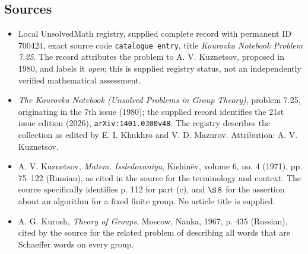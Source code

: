 \documentclass[11pt]{article}
\begin{document}
\subsection{Sources}
\begin{itemize}
\item Local UnsolvedMath registry, supplied complete record with permanent ID \(700424\), exact source code \texttt{catalogue entry}, title \emph{Kourovka Notebook Problem 7.25}. The record attributes the problem to A. V. Kuznetsov, proposed in 1980, and labels it \emph{open}; this is supplied registry status, not an independently verified mathematical assessment.
\item \emph{The Kourovka Notebook (Unsolved Problems in Group Theory)}, problem 7.25, originating in the 7th issue (1980); the supplied record identifies the 21st issue edition (2026), \texttt{arXiv:1401.0300v48}. The registry describes the collection as edited by E. I. Khukhro and V. D. Mazurov. Attribution: A. V. Kuznetsov.
\item A. V. Kuznetsov, \emph{Matem. Issledovaniya}, Kishin\"ev, volume 6, no. 4 (1971), pp. 75--122 (Russian), as cited in the source for the terminology and context. The source specifically identifies p. 112 for part (c), and \(\S\,8\) for the assertion about an algorithm for a fixed finite group. No article title is supplied.
\item A. G. Kurosh, \emph{Theory of Groups}, Moscow, Nauka, 1967, p. 435 (Russian), cited by the source for the related problem of describing all words that are Schaeffer words on every group.
\end{itemize}
\end{document}
